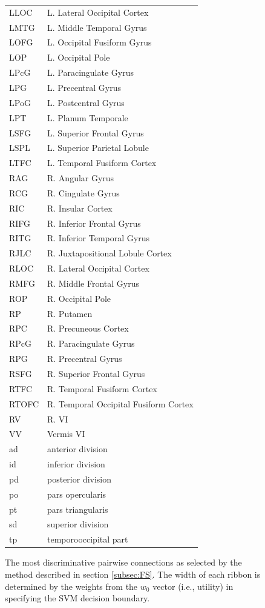 \documentclass{llncs}
\begin{document}
\begin{figure}[htb]
\begin{minipage}[b]{.4\linewidth}
\begin{tabular}{l l}
LLOC	& L. Lateral Occipital Cortex\\
LMTG	& L. Middle Temporal Gyrus\\
LOFG	& L. Occipital Fusiform Gyrus\\
LOP	& L. Occipital Pole\\
LPcG	& L. Paracingulate Gyrus\\
LPG	& L. Precentral Gyrus\\
LPoG	& L. Postcentral Gyrus\\
LPT	& L. Planum Temporale\\
LSFG	& L. Superior Frontal Gyrus\\
LSPL	& L. Superior Parietal Lobule\\
LTFC	& L. Temporal Fusiform Cortex\\
RAG	& R. Angular Gyrus\\
RCG	& R. Cingulate Gyrus\\
RIC	& R. Insular Cortex\\
RIFG	& R. Inferior Frontal Gyrus\\
RITG	& R. Inferior Temporal Gyrus\\
RJLC	& R. Juxtapositional Lobule Cortex\\
RLOC	& R. Lateral Occipital Cortex\\
RMFG	& R. Middle Frontal Gyrus\\
ROP	& R. Occipital Pole\\
RP	& R. Putamen\\
RPC	& R. Precuneous Cortex\\
RPcG	& R. Paracingulate Gyrus\\
RPG	& R. Precentral Gyrus\\
RSFG	& R. Superior Frontal Gyrus\\
RTFC	& R. Temporal Fusiform Cortex\\
RTOFC	& R. Temporal Occipital Fusiform Cortex\\
RV	& R. VI\\
VV	& Vermis VI\\
\hline
ad & anterior division\\
id & inferior division\\
pd & posterior division\\
po & pars opercularis\\
pt & pars triangularis\\
sd & superior division\\
tp & temporooccipital part\\
\hline
\end{tabular}
\par\vspace{0pt}
\end{minipage}
\caption{The most discriminative pairwise connections as selected by the method described in section \ref{subsec:FS}.  The width of each ribbon is determined by the weights from the $w_0$ vector (i.e., utility) in  specifying the SVM decision boundary. }
\label{fig:circos}
\end{figure}
\end{document}
